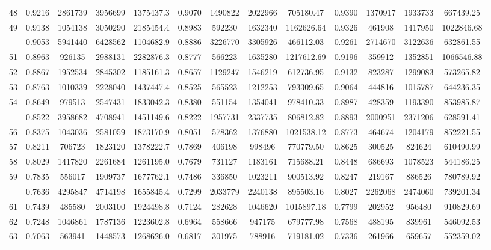 \documentclass[
  12pt,
]{article}
\begin{document}
\begin{longtable}[t]{lcccccccccccc}
48 & 0.9216 & 2861739 & 3956699 & 1375437.3 & 0.9070 & 1490822 & 2022966 & 705180.47 & 0.9390 & 1370917 & 1933733 & 667439.25\\
49 & 0.9138 & 1054138 & 3050290 & 2185454.4 & 0.8983 & 592230 & 1632340 & 1162626.64 & 0.9326 & 461908 & 1417950 & 1022846.68\\
\addlinespace
50 & 0.9053 & 5941440 & 6428562 & 1104682.9 & 0.8886 & 3226770 & 3305926 & 466112.03 & 0.9261 & 2714670 & 3122636 & 632861.55\\
51 & 0.8963 & 926135 & 2988131 & 2282876.3 & 0.8777 & 566223 & 1635280 & 1217612.69 & 0.9196 & 359912 & 1352851 & 1066546.88\\
52 & 0.8867 & 1952534 & 2845302 & 1185161.3 & 0.8657 & 1129247 & 1546219 & 612736.95 & 0.9132 & 823287 & 1299083 & 573265.82\\
53 & 0.8763 & 1010339 & 2228040 & 1437447.4 & 0.8525 & 565523 & 1212253 & 793309.65 & 0.9064 & 444816 & 1015787 & 644236.35\\
54 & 0.8649 & 979513 & 2547431 & 1833042.3 & 0.8380 & 551154 & 1354041 & 978410.33 & 0.8987 & 428359 & 1193390 & 853985.87\\
\addlinespace
55 & 0.8522 & 3958682 & 4708941 & 1451149.6 & 0.8222 & 1957731 & 2337735 & 806812.82 & 0.8893 & 2000951 & 2371206 & 628591.41\\
56 & 0.8375 & 1043036 & 2581059 & 1873170.9 & 0.8051 & 578362 & 1376880 & 1021538.12 & 0.8773 & 464674 & 1204179 & 852221.55\\
57 & 0.8211 & 706723 & 1823120 & 1378222.7 & 0.7869 & 406198 & 998496 & 770779.50 & 0.8625 & 300525 & 824624 & 610490.99\\
58 & 0.8029 & 1417820 & 2261684 & 1261195.0 & 0.7679 & 731127 & 1183161 & 715688.21 & 0.8448 & 686693 & 1078523 & 544186.25\\
59 & 0.7835 & 556017 & 1909737 & 1677762.1 & 0.7486 & 336850 & 1023211 & 900513.92 & 0.8247 & 219167 & 886526 & 780789.92\\
\addlinespace
60 & 0.7636 & 4295847 & 4714198 & 1655845.4 & 0.7299 & 2033779 & 2240138 & 895503.16 & 0.8027 & 2262068 & 2474060 & 739201.34\\
61 & 0.7439 & 485580 & 2003100 & 1924498.8 & 0.7124 & 282628 & 1046620 & 1015897.18 & 0.7799 & 202952 & 956480 & 910829.69\\
62 & 0.7248 & 1046861 & 1787136 & 1223602.8 & 0.6964 & 558666 & 947175 & 679777.98 & 0.7568 & 488195 & 839961 & 546092.53\\
63 & 0.7063 & 563941 & 1448573 & 1268626.0 & 0.6817 & 301975 & 788916 & 719181.02 & 0.7336 & 261966 & 659657 & 552359.02\\

\end{longtable}
\end{document}
